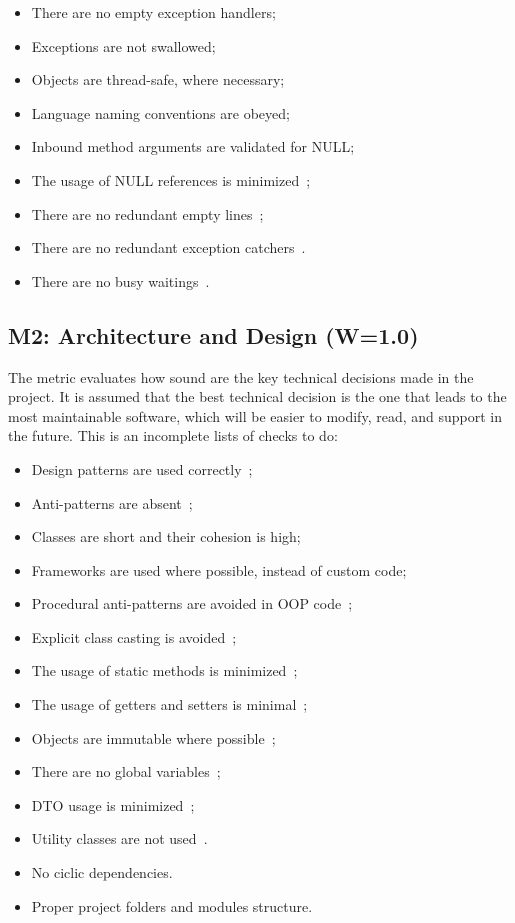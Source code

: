 \documentclass[12pt,oneside]{article}
\begin{document}
\begin{itemize}
\item There are no empty exception handlers;
\item Exceptions are not swallowed;
\item Objects are thread-safe, where necessary;
\item Language naming conventions are obeyed;
\item Inbound method arguments are validated for NULL;
\item The usage of NULL references is minimized~\citep{yb-null};
\item There are no redundant empty lines~\citep{yb-empty-lines};
\item There are no redundant exception catchers~\citep{yb-dont-catch}.
\item There are no busy waitings~\citep{so-busywait}.
\end{itemize}

\subsection{M2: Architecture and Design (W=1.0)}

The metric evaluates how sound are the key technical decisions made
in the project. It is assumed that the best technical decision is the
one that leads to the most maintainable software, which will be easier
to modify, read, and support in the future. This is an incomplete lists of
checks to do:

\begin{itemize}
\item Design patterns are used correctly~\citep{gamma1993design,holub2004holub,freeman2008head,fowler2003patterns};
\item Anti-patterns are absent~\citep{jaafar2013mining};
\item Classes are short and their cohesion is high;
\item Frameworks are used where possible, instead of custom code;
\item Procedural anti-patterns are avoided in OOP code~\citep{yb-er};
\item Explicit class casting is avoided~\citep{yb-casting};
\item The usage of static methods is minimized~\citep{yb-static};
\item The usage of getters and setters is minimal~\citep{yb-getters};
\item Objects are immutable where possible~\citep{yb-immutability};
\item There are no global variables~\citep{yb-global-vars};
\item DTO usage is minimized~\citep{yb-dto};
\item Utility classes are not used~\citep{yb-utility}.
\item No ciclic dependencies.
\item Proper project folders and modules structure.
\end{itemize}
\end{document}
